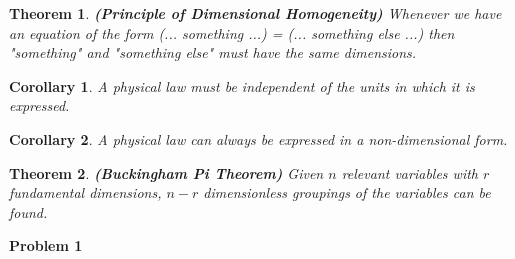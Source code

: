 \documentclass{article}
\newtheorem{theorem}{Theorem}
\newtheorem{corollary}{Corollary}[theorem]
\begin{document}
\begin{theorem}
\label{Homogeneity}
\textnormal{\textbf{(Principle of Dimensional Homogeneity)}} Whenever we have an equation of the form (... something ...) = (... something else ...) then "something" and "something else" must have the same dimensions.
\end{theorem}

\begin{corollary}
A physical law must be independent of the units in which it is expressed.
\end{corollary}
\begin{corollary}
A physical law can always be expressed in a non-dimensional form.
\end{corollary}

\begin{theorem}
\label{Buckingham-Pi}
\textnormal{\textbf{(Buckingham Pi Theorem)}} Given $n$ relevant variables with $r$ fundamental dimensions, $n - r$ dimensionless groupings of the variables can be found.
\end{theorem}

\textbf{Problem 1}
\end{document}
